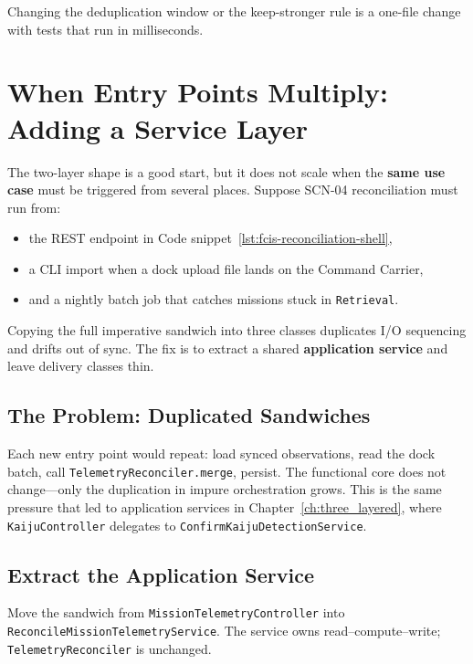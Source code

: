 \label{lst:fcis-reconciliation-test}

Changing the deduplication window or the keep-stronger rule is a one-file change with tests that run in milliseconds.

\section{When Entry Points Multiply: Adding a Service Layer}
\label{sec:fcis_evolution_service}

The two-layer shape is a good start, but it does not scale when the \textbf{same use case} must be triggered from several places. Suppose SCN-04 reconciliation must run from:
\begin{itemize}
    \item the REST endpoint in Code snippet~\ref{lst:fcis-reconciliation-shell},
    \item a CLI import when a dock upload file lands on the Command Carrier,
    \item and a nightly batch job that catches missions stuck in \texttt{Retrieval}.
\end{itemize}
Copying the full imperative sandwich into three classes duplicates I/O sequencing and drifts out of sync. The fix is to extract a shared \textbf{application service} and leave delivery classes thin.

\subsection{The Problem: Duplicated Sandwiches}
\label{sec:fcis_evolution_problem}

Each new entry point would repeat: load synced observations, read the dock batch, call \texttt{TelemetryReconciler.merge}, persist. The functional core does not change---only the duplication in impure orchestration grows. This is the same pressure that led to application services in Chapter~\ref{ch:three_layered}, where \texttt{KaijuController} delegates to \texttt{ConfirmKaijuDetectionService}.

\subsection{Extract the Application Service}
\label{sec:fcis_evolution_extract}

Move the sandwich from \texttt{MissionTelemetryController} into \texttt{ReconcileMissionTelemetryService}. The service owns read--compute--write; \texttt{TelemetryReconciler} is unchanged.


